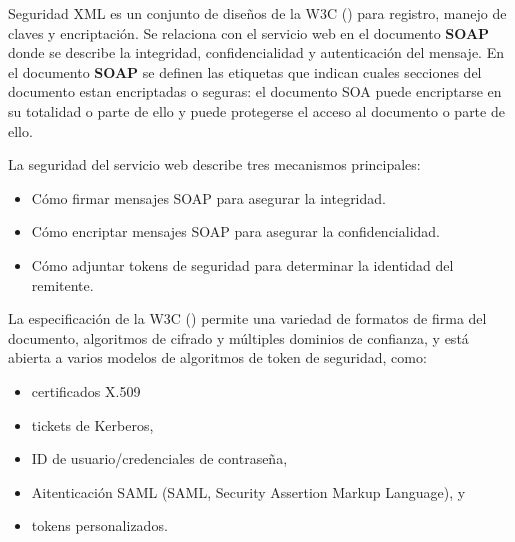   	 Seguridad XML es un conjunto de diseños de la W3C (\cite{W3C2022}) para registro, manejo de claves y encriptación. Se relaciona con el servicio web  en el documento \textbf{SOAP} donde se describe  la integridad, confidencialidad y autenticación del mensaje.  En el documento \textbf{SOAP} se definen las etiquetas que indican cuales secciones del documento estan encriptadas o seguras: el documento SOA puede  encriptarse en su totalidad  o parte de ello y puede protegerse el acceso  al documento o parte de ello.
  	 
  	La seguridad del servicio web describe tres mecanismos principales:
  	
  	\begin{itemize}
  		\item Cómo firmar mensajes SOAP para asegurar la integridad. 
  		\item 	Cómo encriptar mensajes SOAP para asegurar la confidencialidad.
  		\item 	Cómo adjuntar tokens de seguridad para determinar la identidad del remitente.
  	 
  	\end{itemize}
  	 
  	 La especificación de la W3C (\cite{W3C2022})  permite una variedad de formatos de firma del documento, algoritmos de cifrado y múltiples dominios de confianza, y está abierta a varios modelos de algoritmos de token de seguridad, como:
  	 \begin{itemize}
  	 	\item certificados X.509
  	 	\item tickets de Kerberos,
  	 	\item ID de usuario/credenciales de contraseña,
  	 	\item Aitenticaci\'on SAML (SAML, Security Assertion Markup Language), y
  	 	\item tokens personalizados.
  	 \end{itemize}
  	 
